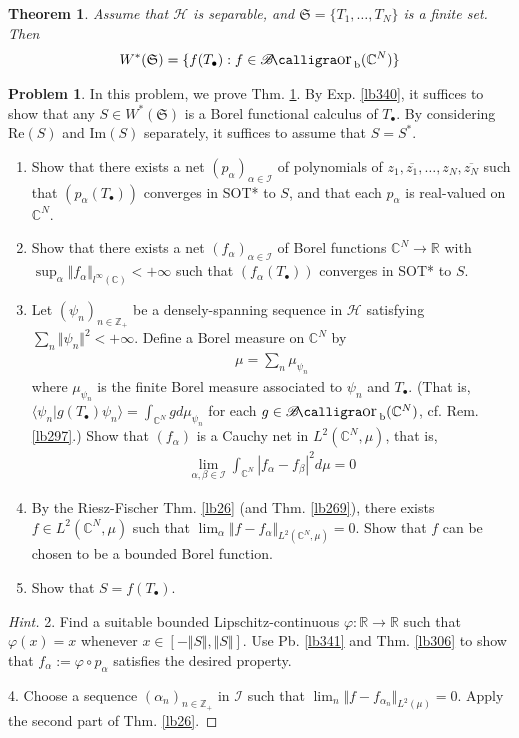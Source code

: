 \documentclass[12pt,b5paper,notitlepage]{article}
\theoremstyle{definition}
\newtheorem{prob}{\color{red}Problem}[section]
\theoremstyle{plain}
\newtheorem{thm}[df]{Theorem}
\DeclareMathOperator{\Borb}{{\mathscr{B}\text{\kern -2pt {\calligra\large or}}\,}_{\mathrm b}}
\newcommand{\fk}{\mathfrak}
\newcommand{\ovl}{\overline}
\newcommand{\bk}[1]{\langle {#1}\rangle}
\newcommand{\blt}{\bullet}
\newcommand{\Cbb}{\mathbb C}
\newcommand{\Zbb}{\mathbb Z}
\newcommand{\Rbb}{\mathbb R}
\newcommand{\Real}{\mathrm{Re}}
\newcommand{\Imag}{\mathrm{Im}}
\newcommand{\MH}{\mathcal H}
\newcommand{\SI}{\mathscr I}
\numberwithin{equation}{section}
\begin{document}
\begin{thm}\label{lb339}
Assume that $\MH$ is separable, and $\fk S=\{T_1,\dots,T_N\}$ is a finite set. Then
\begin{align*}
W^*(\fk S)=\{f(T_\blt):f\in\Borb(\Cbb^N)\}
\end{align*}
\end{thm}


\begin{prob}\label{lb344}
In this problem, we prove Thm. \ref{lb339}. By Exp. \ref{lb340}, it suffices to show that any $S\in W^*(\fk S)$ is a Borel functional calculus of $T_\blt$. By considering $\Real(S)$ and $\Imag(S)$ separately, it suffices to assume that $S=S^*$.
\begin{enumerate}
\item Show that there exists a net $(p_\alpha)_{\alpha\in\SI}$ of polynomials of $z_1,\ovl{z_1},\dots,z_N,\ovl{z_N}$ such that $(p_\alpha(T_\blt))$ converges in SOT* to $S$, and that each $p_\alpha$ is real-valued on $\Cbb^N$.
\item Show that there exists a net $(f_\alpha)_{\alpha\in\SI}$ of Borel functions $\Cbb^N\rightarrow\Rbb$ with $\sup_\alpha\Vert f_\alpha\Vert_{l^\infty(\Cbb)}<+\infty$ such that $(f_\alpha(T_\blt))$ converges in SOT* to $S$.
\item Let $(\psi_n)_{n\in\Zbb_+}$ be a densely-spanning sequence in $\MH$ satisfying $\sum_n\Vert\psi_n\Vert^2<+\infty$. Define a Borel measure on $\Cbb^N$ by
\begin{align*}
\mu=\sum_n \mu_{\psi_n}
\end{align*}
where $\mu_{\psi_n}$ is the finite Borel measure associated to $\psi_n$ and $T_\blt$. (That is, $\bk{\psi_n|g(T_\blt)\psi_n}=\int_{\Cbb^N}gd\mu_{\psi_n}$ for each $g\in\Borb(\Cbb^N)$, cf. Rem. \ref{lb297}.) Show that $(f_\alpha)$ is a Cauchy net in $L^2(\Cbb^N,\mu)$, that is,
\begin{align*}
\lim_{\alpha,\beta\in\SI}\int_{\Cbb^N} |f_\alpha-f_\beta|^2d\mu=0
\end{align*}
\item By the Riesz-Fischer Thm. \ref{lb26} (and Thm. \ref{lb269}), there exists $f\in L^2(\Cbb^N,\mu)$ such that $\lim_\alpha\Vert f-f_\alpha\Vert_{L^2(\Cbb^N,\mu)}=0$. Show that $f$ can be chosen to be a bounded Borel function.
\item Show that $S=f(T_\blt)$.
\end{enumerate}
\end{prob}


\begin{proof}[Hint]
2. Find a suitable bounded Lipschitz-continuous $\varphi:\Rbb\rightarrow\Rbb$ such that $\varphi(x)=x$ whenever $x\in [-\Vert S\Vert,\Vert S\Vert]$. Use Pb. \ref{lb341} and Thm. \ref{lb306} to show that $f_\alpha:=\varphi\circ p_\alpha$ satisfies the desired property.

4. Choose a sequence $(\alpha_n)_{n\in\Zbb_+}$ in $\SI$ such that $\lim_n \Vert f-f_{\alpha_n}\Vert_{L^2(\mu)}=0$. Apply the second part of Thm. \ref{lb26}.
\end{proof}
\end{document}
